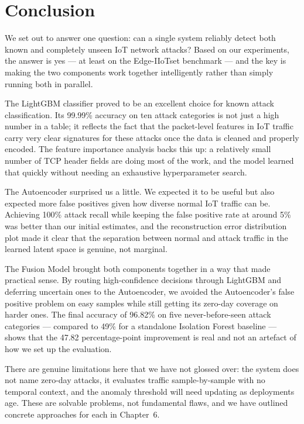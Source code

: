 \documentclass[12pt,a4paper]{report}
\begin{document}
\chapter{Conclusion}

We set out to answer one question: can a single system reliably detect both known
and completely unseen IoT network attacks? Based on our experiments, the answer
is yes --- at least on the Edge-IIoTset benchmark --- and the key is making the
two components work together intelligently rather than simply running both in
parallel.

\noindent The LightGBM classifier proved to be an excellent choice for known
attack classification. Its 99.99\% accuracy on ten attack categories is not
just a high number in a table; it reflects the fact that the packet-level
features in IoT traffic carry very clear signatures for these attacks once
the data is cleaned and properly encoded. The feature importance analysis backs
this up: a relatively small number of TCP header fields are doing most of the
work, and the model learned that quickly without needing an exhaustive
hyperparameter search.

\noindent The Autoencoder surprised us a little. We expected it to be useful but
also expected more false positives given how diverse normal IoT traffic can be.
Achieving 100\% attack recall while keeping the false positive rate at around 5\%
was better than our initial estimates, and the reconstruction error distribution
plot made it clear that the separation between normal and attack traffic in the
learned latent space is genuine, not marginal.

\noindent The Fusion Model brought both components together in a way that made
practical sense. By routing high-confidence decisions through LightGBM and
deferring uncertain ones to the Autoencoder, we avoided the Autoencoder's false
positive problem on easy samples while still getting its zero-day coverage on
harder ones. The final accuracy of 96.82\% on five never-before-seen attack
categories --- compared to 49\% for a standalone Isolation Forest baseline ---
shows that the 47.82 percentage-point improvement is real and not an artefact
of how we set up the evaluation.

\noindent There are genuine limitations here that we have not glossed over:
the system does not name zero-day attacks, it evaluates traffic sample-by-sample
with no temporal context, and the anomaly threshold will need updating as
deployments age. These are solvable problems, not fundamental flaws, and we have
outlined concrete approaches for each in Chapter~6.
\end{document}
